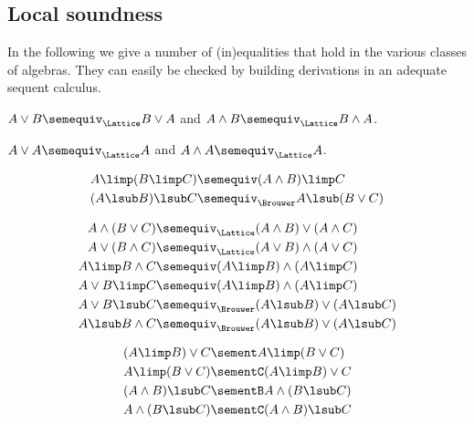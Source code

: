 \subsection{Local soundness}

In the following we give a number of (in)equalities that hold in the various
classes of algebras. They can easily be checked by building derivations in an
adequate sequent calculus.

\begin{fact}[Commutativity]
  $A \lor B \semequiv_{\Lattice} B \lor A$ and $A \land B \semequiv_{\Lattice} B \land A$.
\end{fact}

\begin{fact}[Idempotency]
  $A \lor A \semequiv_{\Lattice} A$ and $A \land A \semequiv_{\Lattice} A$.
\end{fact}

\begin{fact}[Currying]
  \begin{align*}
    A \limp (B \limp C) &\semequiv (A \land B) \limp C \\
    (A \lsub B) \lsub C &\semequiv_{\Brouwer} A \lsub (B \lor C)
  \end{align*}
\end{fact}

\begin{fact}[Distributivity]
  \begin{align*}
    A \land (B \lor C) &\semequiv_{\Lattice} (A \land B) \lor (A \land C) \\
    A \lor (B \land C) &\semequiv_{\Lattice} (A \lor B) \land (A \lor C) \\
    A \limp B \land C &\semequiv (A \limp B) \land (A \limp C) \\
    A \lor B \limp C &\semequiv (A \limp B) \land (A \limp C) \\
    A \lor B \lsub C &\semequiv_{\Brouwer} (A \lsub B) \lor (A \lsub C) \\
    A \lsub B \land C &\semequiv_{\Brouwer} (A \lsub B) \lor (A \lsub C)
  \end{align*}
\end{fact}

\begin{fact}
  \begin{align*}
    (A \limp B) \lor C &\sement A \limp (B \lor C) \\
    A \limp (B \lor C) &\sementC (A \limp B) \lor C \\
    (A \land B) \lsub C &\sementB A \land (B \lsub C) \\
    A \land (B \lsub C) &\sementC (A \land B) \lsub C
  \end{align*}
\end{fact}

